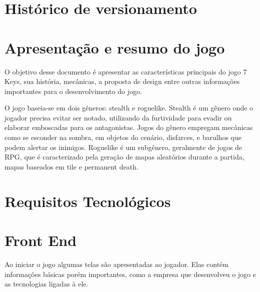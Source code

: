 \documentclass{article}
\begin{document}

\onehalfspacing
\tableofcontents
\pagebreak
\section{Histórico de versionamento}

\newpage
\section{Apresentação e resumo do jogo}
     O objetivo desse documento é apresentar as características principais do jogo 7 Keys, sua história, mecânicas, a proposta de design entre outras informações importantes para o desenvolvimento do jogo.
     
     O jogo baseia-se em dois gêneros: stealth e roguelike. Stealth é um gênero onde o jogador precisa evitar ser notado, utilizando da furtividade para evadir ou elaborar emboscadas para os antagonistas. Jogos do gênero empregam mecânicas como se esconder na sombra, em objetos do cenário, disfarces, e barulhos que podem alertar os inimigos. Roguelike é um subgênero, geralmente de jogos de RPG, que é caracterizado pela geração de mapas aleatórios durante a partida, mapas baseados em tile e permanent death.

    
\section{Requisitos Tecnológicos}

\section{Front End}
Ao iniciar o jogo algumas telas são apresentadas ao jogador. Elas contém informações básicas porém importantes, como a empresa que desenvolveu o jogo e as tecnologias ligadas à ele. 
\end{document}
